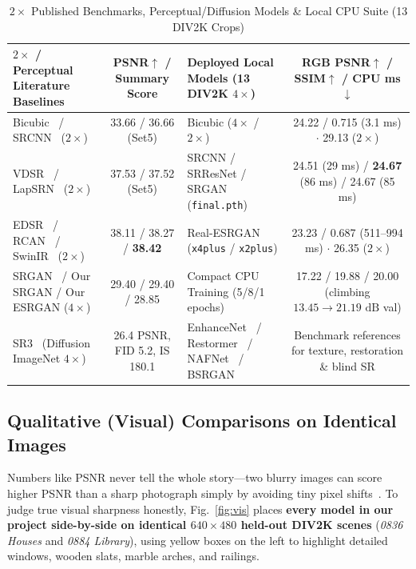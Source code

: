 \documentclass[10pt,onecolumn,journal]{IEEEtran}
\begin{document}
\begin{table}[t]
\centering
\caption{$2\times$ Published Benchmarks, Perceptual/Diffusion Models \& Local CPU Suite (13 DIV2K Crops)}
\label{tab:regime_b}
\scriptsize
\begin{tabular}{@{}lc|lc@{}}
\toprule
\textbf{$2\times$ / Perceptual Literature Baselines} & \textbf{PSNR$\uparrow$ / Summary Score} & \textbf{Deployed Local Models (13 DIV2K $4\times$)} & \textbf{RGB PSNR$\uparrow$ / SSIM$\uparrow$ / CPU ms$\downarrow$} \\
\midrule
Bicubic~\cite{keys1981cubic} / SRCNN~\cite{dong2016srcnn} ($2\times$) & 33.66 / 36.66 (Set5) & Bicubic ($4\times$ / $2\times$) & 24.22 / 0.715 (3.1 ms) $\cdot$ 29.13 ($2\times$) \\
VDSR~\cite{kim2016vdsr} / LapSRN~\cite{lai2017lapsrn} ($2\times$) & 37.53 / 37.52 (Set5) & SRCNN / SRResNet / SRGAN (\texttt{final.pth}) & 24.51 (29 ms) / \textbf{24.67} (86 ms) / 24.67 (85 ms) \\
EDSR~\cite{lim2017edsr} / RCAN~\cite{zhang2018rcan} / SwinIR~\cite{liang2021swinir} ($2\times$) & 38.11 / 38.27 / \textbf{38.42} & Real-ESRGAN (\texttt{x4plus} / \texttt{x2plus}) & 23.23 / 0.687 (511--994 ms) $\cdot$ 26.35 ($2\times$) \\
SRGAN~\cite{ledig2017srgan} / Our SRGAN / Our ESRGAN ($4\times$) & 29.40 / 29.40 / 28.85 & Compact CPU Training (5/8/1 epochs) & 17.22 / 19.88 / 20.00 (climbing $13.45 \to 21.19\text{ dB}$ val) \\
SR3~\cite{saharia2023sr3} (Diffusion ImageNet $4\times$) & 26.4 PSNR, FID 5.2, IS 180.1 & EnhanceNet~\cite{sajjadi2017enhancenet} / Restormer~\cite{zamir2022restormer} / NAFNet~\cite{chen2022nafnet} / BSRGAN~\cite{zhang2021bsrgan} & Benchmark references for texture, restoration \& blind SR \\
\bottomrule
\end{tabular}
\end{table}

\clearpage
\subsection{Qualitative (Visual) Comparisons on Identical Images}
Numbers like PSNR never tell the whole story---two blurry images can score higher PSNR than a sharp photograph simply by avoiding tiny pixel shifts~\cite{blau2018tradeoff}. To judge true visual sharpness honestly, Fig.~\ref{fig:vis} places \textbf{every model in our project side-by-side on identical $640\times480$ held-out DIV2K scenes} (\textit{0836 Houses} and \textit{0884 Library}), using yellow boxes on the left to highlight detailed windows, wooden slats, marble arches, and railings.
\end{document}
